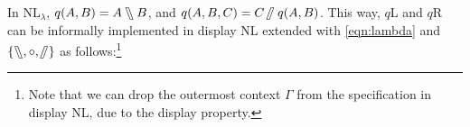 In NL$_\lambda$, $q(A,B) = A\fatbslash B$, and $q(A,B,C) = C\!\!\fatslash\:
q(A,B)$. This way, $q$L and $q$R can be informally implemented in
display NL extended with \eqref{eqn:lambda} and
$\{\fatbslash,\mathbin{\circ},\!\!\fatslash\:\}$ as follows:\footnote{%
  Note that we can drop the outermost context $\Gamma$ from the
  specification in display NL, due to the display property.
}
\begin{center}
  \begin{pfbox}
    \RightLabel{\eqref{eqn:lambda}}
  \end{pfbox}
  \begin{pfbox}
    \RightLabel{\eqref{eqn:lambda}}
  \end{pfbox}
\end{center}

